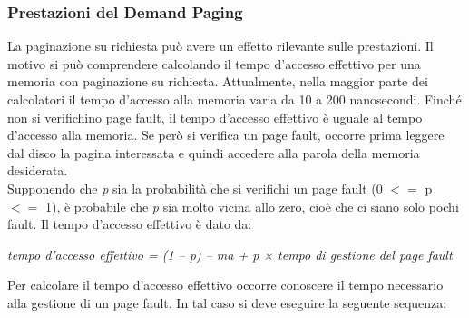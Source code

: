 \documentclass{article}
\begin{document}
			\subsubsection{Prestazioni del Demand Paging}
				La paginazione su richiesta può avere un effetto rilevante sulle prestazioni. Il motivo si può comprendere calcolando il tempo d’accesso effettivo per una memoria con paginazione su richiesta. Attualmente, nella maggior parte dei calcolatori il tempo d’accesso alla memoria varia da 10 a 200 nanosecondi. Finché non si verifichino page fault, il tempo d’accesso effettivo è uguale al tempo d’accesso alla memoria. Se però si verifica un page fault, occorre prima leggere dal disco la pagina interessata e quindi accedere alla parola della memoria desiderata.
				\\Supponendo che \textit{p} sia la probabilità che si verifichi un page fault (0 $<=$ p $<=$ 1), è probabile che \textit{p} sia molto vicina allo zero, cioè che ci siano solo pochi fault. Il tempo d’accesso effettivo è dato da:
				\begin{center}
					\textit{tempo d’accesso effettivo = (1 – p) – ma + p × tempo di gestione del page fault}
				\end{center}
				Per calcolare il tempo d’accesso effettivo occorre conoscere il tempo necessario alla gestione di un page fault. In tal caso si deve eseguire la seguente sequenza:
\end{document}
